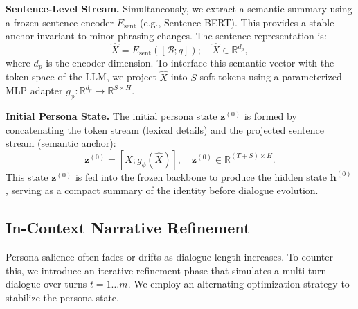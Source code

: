 \noindent \textbf{Sentence-Level Stream.}
Simultaneously, we extract a semantic summary using a frozen sentence encoder $E_{\text{sent}}$ (e.g., Sentence-BERT). This provides a stable anchor invariant to minor phrasing changes. The sentence representation is:
\begin{equation}
    \hat{X} = E_{\text{sent}}([\mathcal{B}; q]); \quad \hat{X} \in \mathbb{R}^{d_p},
\end{equation}
where $d_p$ is the encoder dimension. To interface this semantic vector with the token space of the LLM, we project $\hat{X}$ into $S$ soft tokens using a parameterized MLP adapter $g_\phi: \mathbb{R}^{d_p} \to \mathbb{R}^{S \times H}$.



 

\noindent \textbf{Initial Persona State.} 
The initial persona state $\mathbf{z}^{(0)}$ is formed by concatenating the token stream (lexical details) and the projected sentence stream (semantic anchor):
\begin{equation}
    \mathbf{z}^{(0)} = [X; g_\phi(\hat{X})], \quad \mathbf{z}^{(0)} \in \mathbb{R}^{(T+S) \times H}.
\end{equation}
This state $\mathbf{z}^{(0)}$ is fed into the frozen backbone to produce the hidden state $\mathbf{h}^{(0)}$, serving as a compact summary of the identity before dialogue evolution.










\subsection{In-Context Narrative Refinement}\label{sec:refine}
Persona salience often fades or drifts as dialogue length increases. To counter this, we introduce an iterative refinement phase that simulates a multi-turn dialogue over turns $t=1 \dots m$. We employ an alternating optimization strategy to stabilize the persona state.


